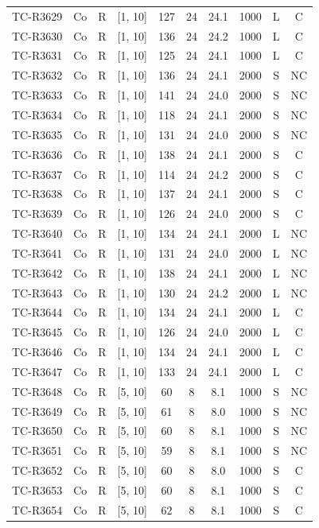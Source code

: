 \begin{longtable}{lccccccccc}
TC-R3629 & Co & R & [1, 10] & 127 & 24 & 24.1 & 1000 & L & C \\
TC-R3630 & Co & R & [1, 10] & 136 & 24 & 24.2 & 1000 & L & C \\
TC-R3631 & Co & R & [1, 10] & 125 & 24 & 24.1 & 1000 & L & C \\
TC-R3632 & Co & R & [1, 10] & 136 & 24 & 24.1 & 2000 & S & NC \\
TC-R3633 & Co & R & [1, 10] & 141 & 24 & 24.0 & 2000 & S & NC \\
TC-R3634 & Co & R & [1, 10] & 118 & 24 & 24.1 & 2000 & S & NC \\
TC-R3635 & Co & R & [1, 10] & 131 & 24 & 24.0 & 2000 & S & NC \\
TC-R3636 & Co & R & [1, 10] & 138 & 24 & 24.1 & 2000 & S & C \\
TC-R3637 & Co & R & [1, 10] & 114 & 24 & 24.2 & 2000 & S & C \\
TC-R3638 & Co & R & [1, 10] & 137 & 24 & 24.1 & 2000 & S & C \\
TC-R3639 & Co & R & [1, 10] & 126 & 24 & 24.0 & 2000 & S & C \\
TC-R3640 & Co & R & [1, 10] & 134 & 24 & 24.1 & 2000 & L & NC \\
TC-R3641 & Co & R & [1, 10] & 131 & 24 & 24.0 & 2000 & L & NC \\
TC-R3642 & Co & R & [1, 10] & 138 & 24 & 24.1 & 2000 & L & NC \\
TC-R3643 & Co & R & [1, 10] & 130 & 24 & 24.2 & 2000 & L & NC \\
TC-R3644 & Co & R & [1, 10] & 134 & 24 & 24.1 & 2000 & L & C \\
TC-R3645 & Co & R & [1, 10] & 126 & 24 & 24.0 & 2000 & L & C \\
TC-R3646 & Co & R & [1, 10] & 134 & 24 & 24.1 & 2000 & L & C \\
TC-R3647 & Co & R & [1, 10] & 133 & 24 & 24.1 & 2000 & L & C \\
TC-R3648 & Co & R & [5, 10] & 60 & 8 & 8.1 & 1000 & S & NC \\
TC-R3649 & Co & R & [5, 10] & 61 & 8 & 8.0 & 1000 & S & NC \\
TC-R3650 & Co & R & [5, 10] & 60 & 8 & 8.1 & 1000 & S & NC \\
TC-R3651 & Co & R & [5, 10] & 59 & 8 & 8.1 & 1000 & S & NC \\
TC-R3652 & Co & R & [5, 10] & 60 & 8 & 8.0 & 1000 & S & C \\
TC-R3653 & Co & R & [5, 10] & 60 & 8 & 8.1 & 1000 & S & C \\
TC-R3654 & Co & R & [5, 10] & 62 & 8 & 8.1 & 1000 & S & C \\

\end{longtable}
